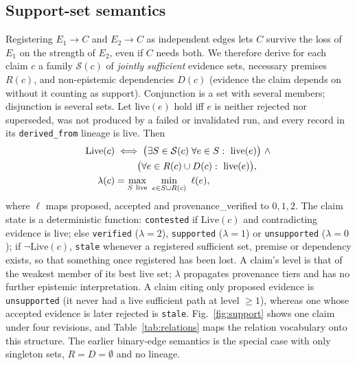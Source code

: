 \documentclass[cmc,article,submit,moreauthors,pdftex]{Definitions/tsp}
\begin{document}
\subsection{Support-set semantics}
\label{sec:support}
Registering $E_1\!\to\! C$ and $E_2\!\to\! C$ as independent edges lets $C$ survive the loss of $E_1$ on the strength of $E_2$, even if $C$ needs both. We therefore derive for each claim $c$ a family $\mathcal{S}(c)$ of \emph{jointly sufficient} evidence sets, necessary premises $R(c)$, and non-epistemic dependencies $D(c)$ (evidence the claim depends on without it counting as support). Conjunction is a set with several members; disjunction is several sets. Let $\mathrm{live}(e)$ hold iff $e$ is neither rejected nor superseded, was not produced by a failed or invalidated run, and every record in its \texttt{derived\_from} lineage is live. Then
\begin{align}
\mathrm{Live}(c) &\iff \big(\exists S\in\mathcal{S}(c)\;\forall e\in S:\ \mathrm{live}(e)\big)\ \wedge\notag\\ &\qquad\ \big(\forall e\in R(c)\cup D(c):\ \mathrm{live}(e)\big),\label{eq:live}\\
\lambda(c) &= \max_{S\ \text{live}}\ \min_{e\in S\cup R(c)}\ \ell(e),\label{eq:level}
\end{align}
where $\ell$ maps proposed, accepted and provenance\_verified to $0,1,2$. The claim state is a deterministic function: \texttt{contested} if $\mathrm{Live}(c)$ and contradicting evidence is live; else \texttt{verified} ($\lambda\!=\!2$), \texttt{supported} ($\lambda\!=\!1$) or \texttt{unsupported} ($\lambda\!=\!0$); if $\neg\mathrm{Live}(c)$, \texttt{stale} whenever a registered sufficient set, premise or dependency exists, so that something once registered has been lost. A claim's level is that of the weakest member of its best live set; $\lambda$ propagates provenance tiers and has no further epistemic interpretation. A claim citing only proposed evidence is \texttt{unsupported} (it never had a live sufficient path at level $\ge1$), whereas one whose accepted evidence is later rejected is \texttt{stale}. Fig.~\ref{fig:support} shows one claim under four revisions, and Table~\ref{tab:relations} maps the relation vocabulary onto this structure. The earlier binary-edge semantics is the special case with only singleton sets, $R\!=\!D\!=\!\emptyset$ and no lineage.
\end{document}
